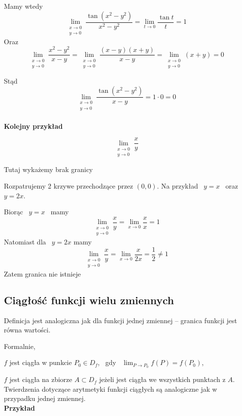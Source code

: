 Mamy wtedy
$$ \lim_{\substack{x \to 0 \\ y \to 0}} \frac{\tan (x^2 - y^2)}{x^2 - y^2} = \lim_{t \to 0} \frac{\tan t}{t} = 1 $$
Oraz
$$ \lim_{\substack{x \to 0 \\ y \to 0}} \frac{x^2 - y^2}{x - y} = \lim_{\substack{x \to 0 \\ y \to 0}} \frac{(x - y)(x + y)}{x - y}
= \lim_{\substack{x \to 0 \\ y \to 0}} (x + y) = 0 $$

Stąd 
$$ \lim_{\substack{x \to 0 \\ y \to 0}} \frac{\tan (x^2 - y^2)}{x - y} = 1 \cdot 0 = 0 $$ \\

\textbf{Kolejny przykład}

$$ \lim_{\substack{x \to 0 \\ y \to 0}} \frac{x}{y} $$

Tutaj wykażemy brak granicy

Rozpatrujemy 2 krzywe przechodzące przez $(0,0)$. Na przykład \ $ y = x $ \ oraz \ $ y = 2x $.

Biorąc \ $ y = x $ \ mamy
$$ \lim_{\substack{x \to 0 \\ y \to 0}} \frac{x}{y} = \lim_{x \to 0} \frac{x}{x} = 1 $$
Natomiast dla \ $ y = 2x $ mamy
$$ \lim_{\substack{x \to 0 \\ y \to 0}} \frac{x}{y} = \lim_{x \to 0} \frac{x}{2x} = \frac{1}{2} \neq 1 $$
Zatem granica nie istnieje \\

\subsection*{Ciągłość funkcji wielu zmiennych}

Definicja jest analogiczna jak dla funkcji jednej zmiennej -- granica funkcji jest równa wartości.

Formalnie,

$f$ jest ciągła w punkcie $ P_0 \in D_f $, \ gdy \ $ \lim_{P \to P_0} f(P) = f(P_0) $,

$f$ jest ciągła na zbiorze $ A \subset D_f $ jeżeli jest ciągła we wszystkich punktach z $A$. \\

Twierdzenia dotyczące arytmetyki funkcji ciągłych są analogiczne jak w przypadku jednej zmiennej. \\

\textbf{Przykład}

